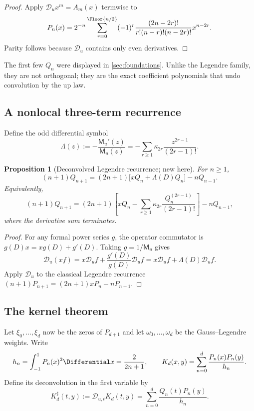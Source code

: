 \documentclass[11pt]{article}
\newtheorem{proposition}[theorem]{Proposition}
\theoremstyle{definition}
\theoremstyle{remark}
\newcommand{\MM}{\mathsf M}
\newcommand{\Dscr}{\mathscr D_{u}}
\begin{document}
\begin{proof}
Apply $\Dscr x^m=A_m(x)$ termwise to
\[
 P_n(x)=2^{-n}\sum_{r=0}^{\Floor{n/2}}(-1)^r
 \frac{(2n-2r)!}{r!(n-r)!(n-2r)!}x^{n-2r}.
\]
Parity follows because $\Dscr$ contains only even derivatives.
\end{proof}

The first few $Q_n$ were displayed in \cref{sec:foundations}.  Unlike the
Legendre family, they are not orthogonal; they are the exact coefficient
polynomials that undo convolution by the up law.

\subsection{A nonlocal three-term recurrence}

Define the odd differential symbol
\begin{equation}
 \Lambda(z):=-\frac{\MM_u'(z)}{\MM_u(z)}
 =-\sum_{r\ge1}\kappa_{2r}\frac{z^{2r-1}}{(2r-1)!}.
 \label{eq:Lambda}
\end{equation}

\begin{proposition}[Deconvolved Legendre recurrence; new here]
\label{prop:Q-recurrence}
For $n\ge1$,
\begin{equation}
 \boxed{
 (n+1)Q_{n+1}
 =(2n+1)\bigl[xQ_n+\Lambda(D)Q_n\bigr]-nQ_{n-1}.}
 \label{eq:Q-recurrence}
\end{equation}
Equivalently,
\begin{equation}
 (n+1)Q_{n+1}
 =(2n+1)\left[xQ_n-
 \sum_{r\ge1}\kappa_{2r}\frac{Q_n^{(2r-1)}}{(2r-1)!}\right]-nQ_{n-1},
 \label{eq:Q-recurrence-expanded}
\end{equation}
where the derivative sum terminates.
\end{proposition}

\begin{proof}
For any formal power series $g$, the operator commutator is
$g(D)x=xg(D)+g'(D)$.  Taking $g=1/\MM_u$ gives
\[
 \Dscr(xf)=x\Dscr f+\frac{g'(D)}{g(D)}\Dscr f
 =x\Dscr f+\Lambda(D)\Dscr f.
\]
Apply $\Dscr$ to the classical Legendre recurrence
$(n+1)P_{n+1}=(2n+1)xP_n-nP_{n-1}$.
\end{proof}

\subsection{The kernel theorem}

Let $\xi_0,\ldots,\xi_d$ now be the zeros of $P_{d+1}$ and let
$\omega_0,\ldots,\omega_d$ be the Gauss--Legendre weights.  Write
\begin{equation}
 h_n=\int_{-1}^{1}P_n(x)^2\Differential x=\frac{2}{2n+1},
 \qquad
 K_d(x,y)=\sum_{n=0}^{d}\frac{P_n(x)P_n(y)}{h_n}.
 \label{eq:CD-kernel}
\end{equation}
Define its deconvolution in the first variable by
\begin{equation}
 K_d^\sharp(t,y)
 :=\mathscr D_{u,t}K_d(t,y)
 =\sum_{n=0}^{d}\frac{Q_n(t)P_n(y)}{h_n}.
 \label{eq:deconv-CD}
\end{equation}
\end{document}

